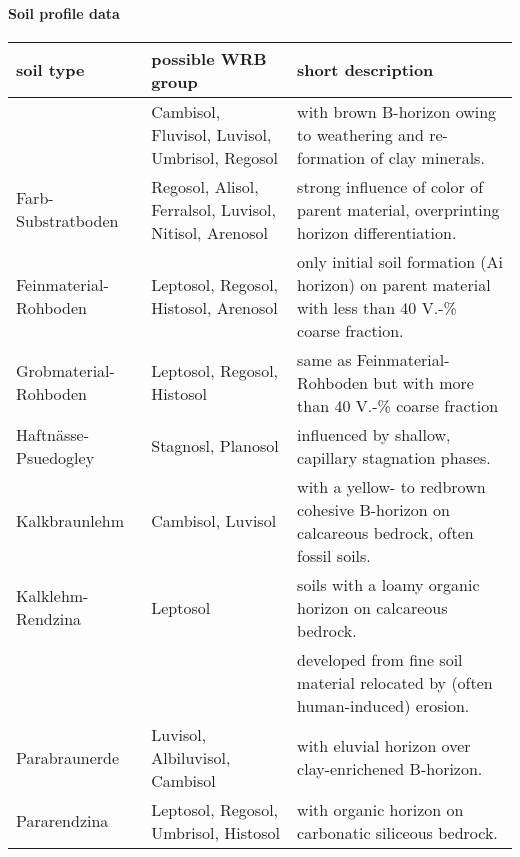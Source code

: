 \documentclass[preprint,12pt,authoryear]{elsarticle}
\begin{document}
\paragraph{Soil profile data}
\begin{table}[ht]
\centering
\small
\begin{tabular}{p{2.5cm}p{3.5cm}p{7.0cm}}
  \hline
soil type  & possible WRB group & short description \\ 
  \hline
 \raisebox{-1.5ex}{Braunerde} & {Cambisol, Fluvisol, Luvisol, Umbrisol, Regosol} & with brown B-horizon owing to  weathering and re-formation of clay minerals. \\ 
 
{Farb-Substratboden} & {Regosol, Alisol, Ferralsol, Luvisol, Nitisol, Arenosol} & {strong influence of color of parent material, overprinting horizon differentiation.} \\ 

Feinmaterial-Rohboden & {Leptosol, Regosol, Histosol, Arenosol} &{only initial soil formation (Ai horizon) on parent material with less than 40 V.-\% coarse fraction.} \\ 

Grobmaterial-Rohboden & {Leptosol, Regosol, Histosol} & {same as Feinmaterial-Rohboden but with more than 40 V.-\% coarse fraction} \\ 

Haftnässe-Psuedogley & {Stagnosl, Planosol} & {influenced by shallow, capillary stagnation phases.} \\ 

Kalkbraunlehm & {Cambisol, Luvisol} & {with a yellow- to redbrown cohesive B-horizon on calcareous bedrock, often fossil soils.} \\ 

Kalklehm-Rendzina & {Leptosol} & {soils with a loamy organic horizon on calcareous bedrock.} \\ 

\raisebox{-1.5ex}{Kolluvisol} & \raisebox{-1.5ex}{Anthrosol} & {developed from fine soil material relocated by (often human-induced) erosion.} \\ 

Parabraunerde& {Luvisol, Albiluvisol, Cambisol} & {with eluvial horizon over clay-enrichened B-horizon.} \\ 

Pararendzina & {Leptosol, Regosol, Umbrisol, Histosol} & {with organic horizon on carbonatic siliceous bedrock.} \\ 


\end{tabular}
\end{table}
\end{document}
